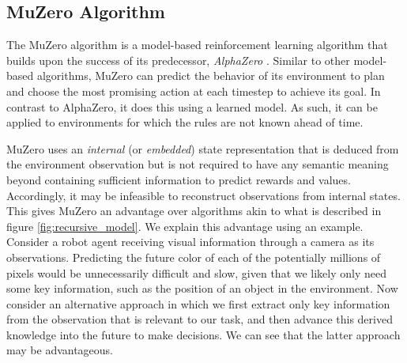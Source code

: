 \newcommand{\policy}{\text{\textbf{p}}}
\newcommand{\svalue}{\nu}

\subsection{MuZero Algorithm}
The MuZero algorithm \cite{muzero} is a model-based reinforcement learning algorithm that builds upon the success of its predecessor, \textit{AlphaZero} \cite{alphazero}. Similar to other model-based algorithms, MuZero can predict the behavior of its environment to plan and choose the most promising action at each timestep to achieve its goal. In contrast to AlphaZero, it does this using a learned model. As such, it can be applied to environments for which the rules are not known ahead of time.

MuZero uses an \textit{internal} (or \textit{embedded}) state representation that is deduced from the environment observation but is not required to have any semantic meaning beyond containing sufficient information to predict rewards and values. Accordingly, it may be infeasible to reconstruct observations from internal states. This gives MuZero an advantage over algorithms akin to what is described in figure \ref{fig:recursive_model}. We explain this advantage using an example. Consider a robot agent receiving visual information through a camera as its observations. Predicting the future color of each of the potentially millions of pixels would be unnecessarily difficult and slow, given that we likely only need some key information, such as the position of an object in the environment. Now consider an alternative approach in which we first extract only key information from the observation that is relevant to our task, and then advance this derived knowledge into the future to make decisions. We can see that the latter approach may be advantageous.


